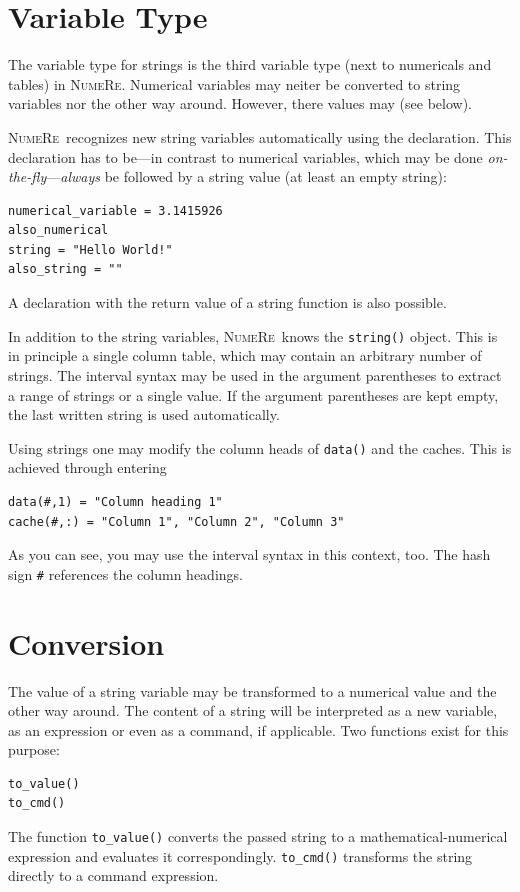 \documentclass[DIV=14,headsepline,footsepline]{scrbook}
\newcommand{\NR}{\textsc{Nu\-me\-Re}}
\begin{document}
			\section{Variable Type}
				The variable type for strings is the third variable type (next to numericals and tables) in \NR. Numerical variables may neiter be converted to string variables nor the other way around. However, there values may (see below).
				
				\NR\ recognizes new string variables automatically using the declaration. This declaration has to be---in contrast to numerical variables, which may be done \emph{on-the-fly}---\emph{always} be followed by a string value (at least an empty string):
				\begin{lstlisting}
numerical_variable = 3.1415926
also_numerical
string = "Hello World!"
also_string = ""
				\end{lstlisting}
				A declaration with the return value of a string function is also possible.
				
				In addition to the string variables, \NR\ knows the \lstinline+string()+ object. This is in principle a single column table, which may contain an arbitrary number of strings. The interval syntax may be used in the argument parentheses to extract a range of strings or a single value. If the argument parentheses are kept empty, the last written string is used automatically.
				
				Using strings one may modify the column heads of \lstinline+data()+ and the caches. This is achieved through entering
				\begin{lstlisting}
data(#,1) = "Column heading 1"
cache(#,:) = "Column 1", "Column 2", "Column 3"
				\end{lstlisting}
				As you can see, you may use the interval syntax in this context, too. The hash sign \lstinline+#+ references the column headings.
				
			\section{Conversion}
				The value of a string variable may be transformed to a numerical value and the other way around. The content of a string will be interpreted as a new variable, as an expression or even as a command, if applicable. Two functions exist for this purpose:
				\begin{lstlisting}
to_value()
to_cmd()
				\end{lstlisting}
				The function \lstinline+to_value()+ converts the passed string to a ma\-the\-ma\-tic\-al-nu\-me\-ri\-cal expression and evaluates it correspondingly. \lstinline+to_cmd()+ transforms the string directly to a command expression.
				
\end{document}

